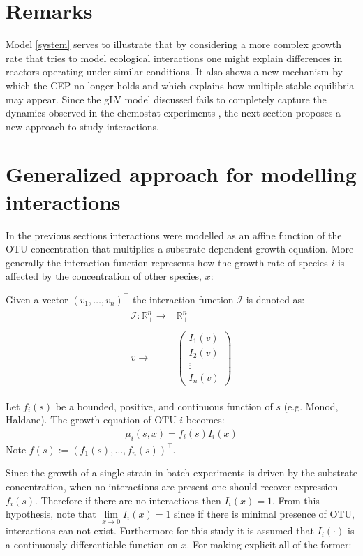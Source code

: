 \documentclass[processes,article,submit,moreauthors,pdftex]{Definitions/mdpi}
\newcommand{\R}{\mathbb{R}}
\newcommand{\I}{\mathcal{I}}
\begin{document}
\section*{Remarks}

Model \eqref{system} serves to illustrate that by considering a more complex growth rate that tries to model ecological interactions one might explain differences in reactors operating under similar conditions. It also shows a new mechanism by which the CEP no longer holds and which explains how multiple stable equilibria may appear. Since the gLV model discussed fails to completely capture the dynamics observed in the chemostat experiments \cite{Dumont2016}, the next section proposes a new approach to study interactions.


\section{Generalized approach for modelling interactions}
In the previous sections interactions were modelled as an affine function of the OTU concentration that multiplies a substrate dependent growth equation. More generally the interaction function represents how the growth rate of species $i$ is affected by the concentration of other species, $x$: 

Given a vector $(v_1,\dots,v_n)^\top$ the interaction function $\I$ is denoted as:
\begin{align}
\begin{array}{rc}
\I: \R_+^n \rightarrow & \R_+^n\\
& \\
v \rightarrow & \begin{pmatrix}
I_1(v) \\
I_2(v) \\ 
\vdots  \\
I_n(v)
\end{pmatrix}
\end{array}
\end{align}

Let $f_i(s)$ be a bounded, positive, and continuous function of $s$ (e.g. Monod, Haldane). The growth equation of OTU $i$ becomes:
\begin{align}
\mu_i(s,x) = f_i(s)I_i(x)
\end{align}
Note $f(s) := (f_1(s),\dots,f_n(s))^\top$.
\label{growthForm}

Since the growth of a single strain in batch experiments is driven by the substrate concentration, when no interactions are present one should recover expression $f_i(s)$. Therefore if there are no interactions then $I_i(x) = 1$. From this hypothesis, note that $ \lim \limits_{x \rightarrow 0} I_i(x) = 1$ since if there is minimal presence of OTU, interactions can not exist. Furthermore for this study it is assumed that $I_i(\cdot)$ is a continuously differentiable function on $x$. For making explicit all of the former:
\end{document}
